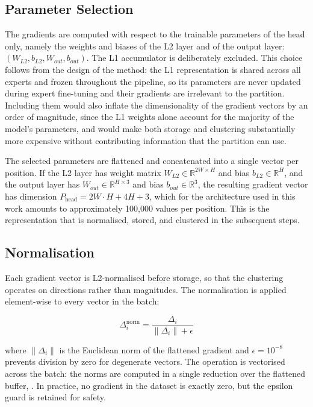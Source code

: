 \subsection{Parameter Selection}

The gradients are computed with respect to the trainable parameters of the head only, namely the weights and biases of the L2 layer and of the output layer: $(W_{L2}, b_{L2}, W_{out}, b_{out})$. The L1 accumulator is deliberately excluded. This choice follows from the design of the method: the L1 representation is shared across all experts and frozen throughout the pipeline, so its parameters are never updated during expert fine-tuning and their gradients are irrelevant to the partition. Including them would also inflate the dimensionality of the gradient vectors by an order of magnitude, since the L1 weights alone account for the majority of the model's parameters, and would make both storage and clustering substantially more expensive without contributing information that the partition can use.

The selected parameters are flattened and concatenated into a single vector per position. If the L2 layer has weight matrix $W_{L2} \in \mathbb{R}^{2W \times H}$ and bias $b_{L2} \in \mathbb{R}^{H}$, and the output layer has $W_{out} \in \mathbb{R}^{H \times 3}$ and bias $b_{out} \in \mathbb{R}^{3}$, the resulting gradient vector has dimension $P_{\text{head}} = 2W \cdot H + 4H + 3$, which for the architecture used in this work amounts to approximately 100,000 values per position. This is the representation that is normalised, stored, and clustered in the subsequent steps.


\subsection{Normalisation}

Each gradient vector is L2-normalised before storage, so that the clustering operates on directions rather than magnitudes. The normalisation is applied element-wise to every vector in the batch:

\[\Delta_i^{\text{norm}} = \frac{\Delta_i}{\|\Delta_i\| + \epsilon}\]

where $\|\Delta_i\|$ is the Euclidean norm of the flattened gradient and $\epsilon = 10^{-8}$ prevents division by zero for degenerate vectors. The operation is vectorised across the batch: the norms are computed in a single reduction over the flattened buffer, . In practice, no gradient in the dataset is exactly zero, but the epsilon guard is retained for safety.

